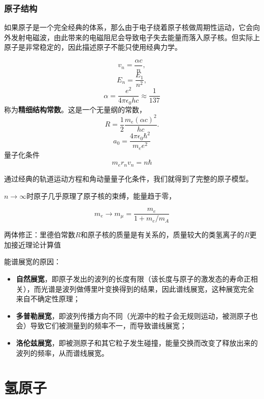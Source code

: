 \documentclass[UTF8, a4paper]{ctexart}
\begin{document}
\subsubsection{原子结构}

如果原子是一个完全经典的体系，那么由于电子绕着原子核做周期性运动，它会向外发射电磁波，由此带来的电磁阻尼会导致电子失去能量而落入原子核。但实际上原子是非常稳定的，因此描述原子不能只使用经典力学。

\[
    v_n = \frac{\alpha c}{n},
\]
\[
    E_n = \frac{E_1}{n^2},
\]
\begin{equation}
    \alpha = \frac{e^2}{4\pi \epsilon_0 h c} \approx \frac{1}{137}
\end{equation}
称为\textbf{精细结构常数}。这是一个无量纲的常数，
\[
    R = \frac{1}{2} \frac{m_e (\alpha c)^2}{hc}.
\]
\[
    a_0 = \frac{4\pi\epsilon_0 \hbar^2}{m_e e^2}
\]
量子化条件
\begin{equation}
    m_e r_n v_n = n \hbar
\end{equation}

通过经典的轨道运动方程和角动量量子化条件，我们就得到了完整的原子模型。

$n\to\infty$时原子几乎原理了原子核的束缚，能量趋于零，

\[
    m_e \longrightarrow m_\mu = \frac{m_e}{1 + m_e/m_A}
\]

两体修正：里德伯常数$R$和原子核的质量是有关系的，质量较大的类氢离子的$R$更加接近理论计算值

能谱展宽的原因：
\begin{itemize}
    \item \textbf{自然展宽}，即原子发出的波列的长度有限（该长度与原子的激发态的寿命正相关），而光谱是波列做傅里叶变换得到的结果，因此谱线展宽，这种展宽完全来自不确定性原理；
    \item \textbf{多普勒展宽}，即波列传播方向不同（光源中的粒子会无规则运动，被测原子也会）导致它们被测量到的频率不一，而导致谱线展宽；
    \item \textbf{洛伦兹展宽}，即被测原子和其它粒子发生碰撞，能量交换而改变了释放出来的波列的频率，从而谱线展宽。
\end{itemize}

\section{氢原子}
\end{document}
